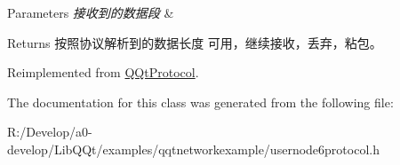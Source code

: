 \begin{DoxyParams}{Parameters}
{\em 接收到的数据段} & \\
\hline
\end{DoxyParams}
\begin{DoxyReturn}{Returns}
按照协议解析到的数据长度 可用，继续接收，丢弃，粘包。 
\end{DoxyReturn}


Reimplemented from \mbox{\hyperlink{class_q_qt_protocol_a00fd0c1ac23379ed3b9b25da9a34f39b}{Q\+Qt\+Protocol}}.



The documentation for this class was generated from the following file\+:\begin{DoxyCompactItemize}
\item 
R\+:/\+Develop/a0-\/develop/\+Lib\+Q\+Qt/examples/qqtnetworkexample/usernode6protocol.\+h\end{DoxyCompactItemize}
